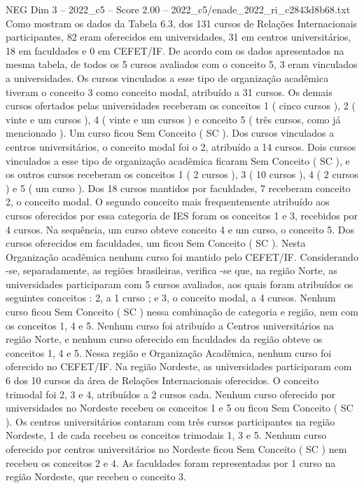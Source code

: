 \begin{textsample}{NEG Dim 3 – 2022\_c5 – Score 2.00 – 2022\_c5/enade\_2022\_ri\_c2843d8b68.txt}
Como mostram os dados da Tabela 6.3, dos 131 cursos de Relações Internacionais participantes, 82 eram oferecidos em universidades, 31 em centros universitários, 18 em faculdades e 0 em CEFET/IF.
De acordo com os dados apresentados na mesma tabela, de todos os 5 cursos avaliados com o conceito 5, 3 eram vinculados a universidades.
Os cursos vinculados a esse tipo de organização acadêmica tiveram o conceito 3 como conceito modal, atribuído a 31 cursos.
Os demais cursos ofertados pelas universidades receberam os conceitos 1 ( cinco cursos ), 2 ( vinte e um cursos ), 4 ( vinte e um cursos ) e conceito 5 ( três cursos, como já mencionado ).
Um curso ficou Sem Conceito ( SC ).
Dos cursos vinculados a centros universitários, o conceito modal foi o 2, atribuído a 14 cursos.
Dois cursos vinculados a esse tipo de organização acadêmica ficaram Sem Conceito ( SC ), e os outros cursos receberam os conceitos 1 ( 2 cursos ), 3 ( 10 cursos ), 4 ( 2 cursos ) e 5 ( um curso ).
Dos 18 cursos mantidos por faculdades, 7 receberam conceito 2, o conceito modal.
O segundo conceito mais frequentemente atribuído aos cursos oferecidos por essa categoria de IES foram os conceitos 1 e 3, recebidos por 4 cursos.
Na sequência, um curso obteve conceito 4 e um curso, o conceito 5.
Dos cursos oferecidos em faculdades, um ficou Sem Conceito ( SC ).
Nesta Organização acadêmica nenhum curso foi mantido pelo CEFET/IF.
Considerando -se, separadamente, as regiões brasileiras, verifica -se que, na região Norte, as universidades participaram com 5 cursos avaliados, aos quais foram atribuídos os seguintes conceitos : 2, a 1 curso ; e 3, o conceito modal, a 4 cursos.
Nenhum curso ficou Sem Conceito ( SC ) nessa combinação de categoria e região, nem com os conceitos 1, 4 e 5.
Nenhum curso foi atribuído a Centros universitários na região Norte, e nenhum curso oferecido em faculdades da região obteve os conceitos 1, 4 e 5.
Nessa região e Organização Acadêmica, nenhum curso foi oferecido no CEFET/IF.
Na região Nordeste, as universidades participaram com 6 dos 10 cursos da área de Relações Internacionais oferecidos.
O conceito trimodal foi 2, 3 e 4, atribuídos a 2 cursos cada.
Nenhum curso oferecido por universidades no Nordeste recebeu os conceitos 1 e 5 ou ficou Sem Conceito ( SC ).
Os centros universitários contaram com três cursos participantes na região Nordeste, 1 de cada recebeu os conceitos trimodais 1, 3 e 5.
Nenhum curso oferecido por centros universitários no Nordeste ficou Sem Conceito ( SC ) nem recebeu os conceitos 2 e 4.
As faculdades foram representadas por 1 curso na região Nordeste, que recebeu o conceito 3.

\end{textsample}
